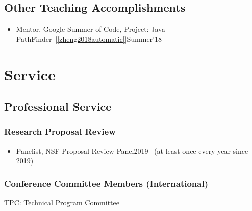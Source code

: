 \documentclass[11pt]{article}
\begin{document}
\subsection{Other Teaching Accomplishments}
\begin{itemize}
\item Mentor, Google Summer of Code, Project: Java PathFinder~[\ref{zheng2018automatic}]\hfill Summer'18
\end{itemize}

\section{Service}
\subsection{Professional Service}

\subsubsection{Research Proposal Review}
\begin{itemize}
\item Panelist, NSF Proposal Review Panel\hfill 2019-- (at least once every year since 2019)
\end{itemize}

\subsubsection{Conference Committee Members (International)}

\begin{description}[before=\small]
\item TPC: Technical Program Committee
\end{description}
\end{document}
